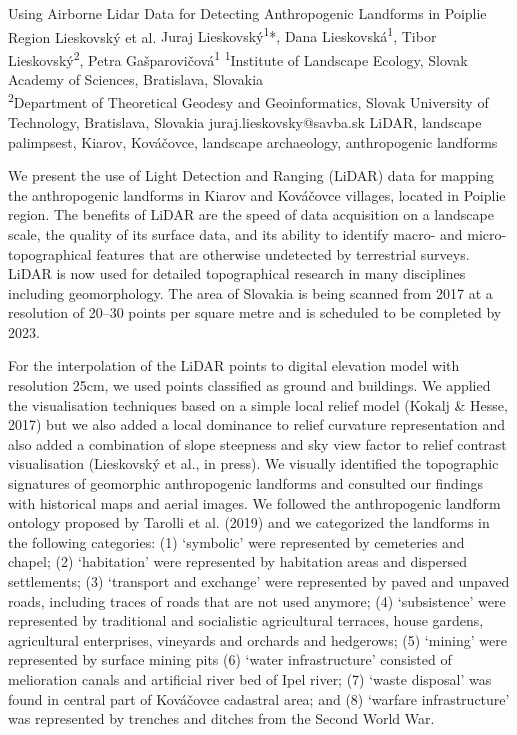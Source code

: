 
\abstract
{Using Airborne Lidar Data for Detecting Anthropogenic Landforms in Poiplie Region} %
{Lieskovský et al.} %
{Juraj Lieskovský\textsuperscript{1}*, Dana Lieskovská\textsuperscript{1}, Tibor Lieskovský\textsuperscript{2}, Petra Gašparovičová\textsuperscript{1}} %
{\TLtag} %
{\textsuperscript{1}Institute of Landscape Ecology, Slovak Academy of Sciences, Bratislava, Slovakia\\
\textsuperscript{2}Department of Theoretical Geodesy and Geoinformatics, Slovak University of Technology, Bratislava, Slovakia
} %
{juraj.lieskovsky@savba.sk}  %
{LiDAR, landscape palimpsest, Kiarov, Kováčovce, landscape archaeology, anthropogenic landforms}%
{We present the use of Light Detection and Ranging  (LiDAR) data for mapping the anthropogenic landforms in Kiarov and Kováčovce villages, located in Poiplie region. The benefits of LiDAR are the speed of data acquisition on a landscape scale, the quality of its surface data, and its ability to identify macro- and micro-topographical features that are otherwise undetected by terrestrial surveys. LiDAR is now used for detailed topographical research in many disciplines including geomorphology. The area of Slovakia is being scanned from 2017 at a resolution of 20–30 points per square metre and is scheduled to be completed by 2023. 
	
For the interpolation of the LiDAR points to digital elevation model with resolution 25cm, we used points classified as ground and buildings. We applied the visualisation techniques based on a simple local relief model (Kokalj \& Hesse, 2017) but we also added a local dominance to relief curvature representation and also added a combination of slope steepness and sky view factor to relief contrast visualisation (Lieskovský et al., in press). We visually identified the topographic signatures of geomorphic anthropogenic landforms and consulted our findings with historical maps and aerial images. We followed the anthropogenic landform ontology proposed by Tarolli et al. (2019) and we categorized the landforms in the following categories: (1) ‘symbolic’ were represented by cemeteries and chapel; (2) ‘habitation’ were represented by habitation areas and dispersed settlements; (3) ‘transport and exchange’ were represented by paved and unpaved roads, including traces of roads that are not used anymore; (4) ‘subsistence’ were represented by traditional and socialistic agricultural terraces, house gardens, agricultural enterprises, vineyards and orchards and  hedgerows; (5) ‘mining’ were represented by surface mining pits (6) ‘water infrastructure’ consisted of melioration canals and artificial river bed of Ipel river; (7) ‘waste disposal’ was found in central part of Kováčovce cadastral area; and (8) ‘warfare infrastructure’ was represented by trenches and ditches from the Second World War.
}%
